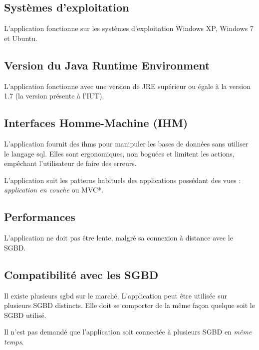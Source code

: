 \subsection{Systèmes d'exploitation}
L'application fonctionne sur les systèmes d'exploitation Windows XP, Windows 7 et Ubuntu.

\subsection{Version du Java Runtime Environment}
L'application fonctionne avec une version de \gls{JRE} supérieur ou égale à la version 1.7 (la version présente à l'IUT).

\subsection{Interfaces Homme-Machine (IHM)}
L'application fournit des \glspl{ihm} pour manipuler les bases de données sans utiliser le langage \gls{sql}.
Elles sont ergonomiques, non boguées et limitent les actions, empêchant l'utilisateur de faire des erreurs.

L'application suit les patterns habituels des applications possédant des vues :
\textit{application en couche} ou \gls{MVC}*.

\subsection{Performances}
L'application ne doit pas être lente, malgré sa connexion à distance avec le SGBD.

\subsection{Compatibilité avec les SGBD}
Il existe plusieurs \gls{sgbd} sur le marché.
L'application peut être utilisée sur plusieurs SGBD distincts.
Elle doit se comporter de la même façon quelque soit le SGBD utilisé.

Il n'est pas demandé que l'application soit connectée à plusieurs SGBD en \textit{même temps}.
